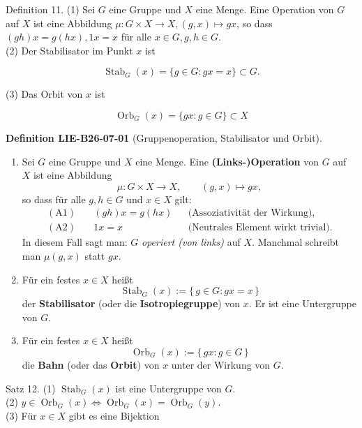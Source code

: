 \documentclass[10pt, letterpaper]{article}
\newcommand{\CustomHeading}[3]{%
  \par\medskip\noindent%
  \textbf{#1 #2} \textnormal{(#3)}.\enskip%
}
\newenvironment{DEF}[2]{\begin{unitbox}\CustomHeading{Definition}{#1}{#2}}{\end{unitbox}}
\begin{document}
Definition 11. (1) Sei $G$ eine Gruppe und $X$ eine Menge. Eine Operation von $G$ auf $X$ ist eine Abbildung $\mu: G \times X \rightarrow X,(g, x) \mapsto g x$, so dass $(g h) x=g(h x), 1 x=x$ für alle $x \in G, g, h \in G$.\\
(2) Der Stabilisator im Punkt $x$ ist

$$
\operatorname{Stab}_{G}(x)=\{g \in G: g x=x\} \subset G .
$$

(3) Das Orbit von $x$ ist

$$
\operatorname{Orb}_{G}(x)=\{g x: g \in G\} \subset X
$$



\begin{DEF}{LIE-B26-07-01}{Gruppenoperation, Stabilisator und Orbit}
\begin{enumerate}
\item
Sei $G$ eine Gruppe und $X$ eine Menge.  
Eine \textbf{(Links-)Operation} von $G$ auf $X$ ist eine Abbildung
\[
\mu : G \times X \longrightarrow X,\qquad (g,x) \longmapsto g x,
\]
so dass für alle $g,h \in G$ und $x \in X$ gilt:
\begin{align*}
(\text{A1}) \quad &(g h) x = g (h x) &&\text{(Assoziativität der Wirkung)},\\
(\text{A2}) \quad &1 x = x &&\text{(Neutrales Element wirkt trivial).}
\end{align*}
In diesem Fall sagt man: $G$ \emph{operiert (von links)} auf $X$.  
Manchmal schreibt man $\mu(g,x)$ statt $g x$.

\item
Für ein festes $x \in X$ heißt
\[
\operatorname{Stab}_{G}(x)
:= \{\, g \in G : g x = x \,\}
\]
der \textbf{Stabilisator} (oder die \textbf{Isotropiegruppe}) von $x$.  
Er ist eine Untergruppe von $G$.

\item
Für ein festes $x \in X$ heißt
\[
\operatorname{Orb}_{G}(x)
:= \{\, g x : g \in G \,\}
\]
die \textbf{Bahn} (oder das \textbf{Orbit}) von $x$ unter der Wirkung von $G$.

\end{enumerate}
\end{DEF}





Satz 12. (1) $\operatorname{Stab}_{G}(x)$ ist eine Untergruppe von $G$.\\
(2) $y \in \operatorname{Orb}_{G}(x) \Longleftrightarrow \operatorname{Orb}_{G}(x)=\operatorname{Orb}_{G}(y)$.\\
(3) Für $x \in X$ gibt es eine Bijektion
\end{document}
